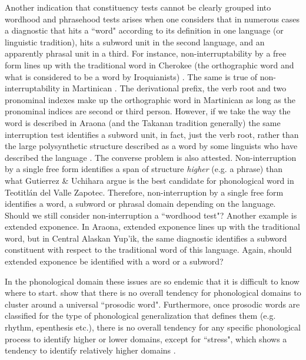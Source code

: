\documentclass[output=paper,draftmode]{langscibook}
\begin{document}
\hspace*{-2.3pt}Another indication that constituency tests cannot be clearly grouped into wordhood and phrasehood tests arises when one considers that in numerous cases a diagnostic that hits a ``word" according to its definition in one language (or linguistic tradition), hits a subword unit in the second language, and an apparently phrasal unit in a third. For instance, non-interruptability by a free form lines up with the traditional word in Cherokee (the orthographic word and what is considered to be a word by Iroquianists) . The same is true of non-interruptability in Martinican . The derivational prefix, the verb root and two pronominal indexes make up the orthographic word in Martinican as long as the pronominal indices are second or third person. 
However, if we take the way the word is described in Araona (and the Takanan tradition generally) the same interruption test identifies a subword unit, in fact, just the verb root, rather than the large polysynthetic structure described as a word by some linguists who have described the language \citep{pitman:1980:araonasketch, emkow:2019:araonarepublish}. The converse problem is also attested. Non-interruption by a single free form identifies a span of structure \textit{higher} (e.g. a phrase) than what Gutierrez \& Uchihara argue is the best candidate for phonological word in Teotitlán del Valle Zapotec. Therefore, non-interruption by a single free form identifies a word, a subword or phrasal domain depending on the language. Should we still consider non-interruption a ``wordhood test"?
Another example is extended exponence. In Araona, extended exponence lines up with the traditional word, but in Central Alaskan Yup'ik, the same diagnostic identifies a subword constituent with respect to the traditional word of this language. Again, should extended exponence be identified with a word or a subword?

In the phonological domain these issues are so endemic that it is difficult to know where to start.  \citet{bickel2009distribution} show that there is no overall tendency for phonological domains to cluster around a universal ``prosodic word". Furthermore, once prosodic words are classified for the type of phonological generalization that defines them (e.g. rhythm, epenthesis etc.), there is no overall tendency for any specific phonological process to identify higher or lower domains, except for ``stress", which shows a tendency to identify relatively higher domains \citep{schiering2012stress}.
\end{document}
